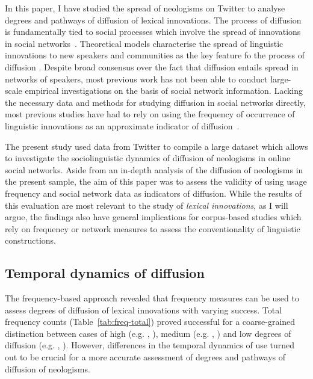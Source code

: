 \documentclass[
  a4paper,
  abstract=on,
  captions=tableabove
  ]{scrartcl}
\begin{document}
  In this paper, I have studied the spread of neologisms on Twitter to analyse degrees and pathways of diffusion of lexical innovations. The process of diffusion is fundamentally tied to social processes which involve the spread of innovations in social networks~\parencite{Rogers1962DiffusionInnovations}. Theoretical models characterise the spread of linguistic innovations to new speakers and communities as the key feature fo the process of diffusion \parencite{Weinreich1968EmpiricalFoundations,Schmid2020DynamicsLinguistic}. Despite broad consensus over the fact that diffusion entails spread in networks of speakers, most previous work has not been able to conduct large-scale empirical investigations on the basis of social network information. Lacking the necessary data and methods for studying diffusion in social networks directly, most previous studies have had to rely on using the frequency of occurrence of linguistic innovations as an approximate indicator of diffusion~\parencite{Stefanowitsch2017CorpusbasedPerspective}.

  The present study used data from Twitter to compile a large dataset which allows to investigate the sociolinguistic dynamics of diffusion of neologisms in online social networks. Aside from an in-depth analysis of the diffusion of neologisms in the present sample, the aim of this paper was to assess the validity of using usage frequency and social network data as indicators of diffusion. While the results of this evaluation are most relevant to the study of \emph{lexical} \emph{innovations}, as I will argue, the findings also have general implications for corpus-based studies which rely on frequency or network measures to assess the conventionality of linguistic constructions.

  \subsection{Temporal dynamics of diffusion}

    The frequency-based approach revealed that frequency measures can be used to assess degrees of diffusion of lexical innovations with varying success. Total frequency counts (Table~\ref{tab:freq-total}) proved successful for a coarse-grained distinction between cases of high (e.g. , ), medium (e.g. , ) and low degrees of diffusion (e.g. , ). However, differences in the temporal dynamics of use turned out to be crucial for a more accurate assessment of degrees and pathways of diffusion of neologisms.
\end{document}
